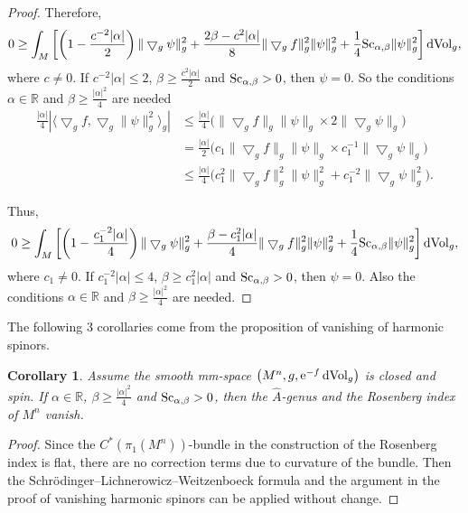 \documentclass[pdftex]{sigma}
\newtheorem{Corollary}[Theorem]{Corollary}
\begin{document}
\begin{proof}
Therefore,
\begin{equation*}
0 \geq \int_M \left[\left(1- \frac{c^{-2} |\alpha|}{2}\right)\|\bigtriangledown_g\psi\|^2_g + \frac{2\beta - c^{2} |\alpha|}{8} \|\bigtriangledown_gf\|^2_g\|\psi\|^2_g + \frac{1}{4} {\rm Sc}_{\alpha, \beta} \|\psi\|^2_g \right]  {\rm dVol}_g ,
\end{equation*}
where $c\neq 0$.
If $c^{-2} |\alpha| \leq 2$, $\beta \geq \frac{c^{2} |\alpha|}{2}$ and ${\rm Sc}_{\alpha, \beta} > 0$, then $\psi = 0$. So the conditions $\alpha \in \mathbb{R}$ and $\beta \geq \frac{|\alpha|^2}{4}$ are needed
\begin{align*}
\frac{|\alpha|}{4}|\big\langle\bigtriangledown_gf, \bigtriangledown_g \|\psi\|^2_g \big\rangle_g| &\leq \frac{|\alpha|}{4}\big(\|\bigtriangledown_gf\|_g \|\psi\|_g \times 2 \|\bigtriangledown_g \psi\|_g\big)\\
& = \frac{|\alpha|}{2}\big( c_1 \|\bigtriangledown_gf\|_g\|\psi\|_g \times c_1^{-1} \|\bigtriangledown_g\psi\|_g\big) \\
& \leq \frac{|\alpha|}{4} \big(c_1^2 \|\bigtriangledown_gf\|^2_g \|\psi\|^2_g + c_1^{-2} \|\bigtriangledown_g\psi\|^2_g\big).
 \end{align*}

Thus,
\begin{equation*}
0 \geq \int_M \left[\left(1- \frac{c_1^{-2} |\alpha|}{4}\right)\|\bigtriangledown_g\psi\|^2_g + \frac{\beta - c_1^{2} |\alpha|}{4} \|\bigtriangledown_gf\|^2_g\|\psi\|^2_g + \frac{1}{4} {\rm Sc}_{\alpha, \beta} \|\psi\|^2_g\right]  {\rm dVol}_g ,
\end{equation*}
where $c_1 \neq 0$. If $c_1^{-2} |\alpha| \leq 4$, $\beta \geq c_1^{2} |\alpha|$ and ${\rm Sc}_{\alpha, \beta} > 0$, then $\psi = 0$. Also the conditions $\alpha \in \mathbb{R}$ and $\beta \geq \frac{|\alpha|^2}{4}$ are needed.
\end{proof}

The following 3 corollaries come from the proposition of vanishing of harmonic spinors.

\begin{Corollary}\label{Genus}
Assume the smooth mm-space $\big(M^n, g, {\rm e}^{-f}\,{\rm dVol}_g\big)$ is closed and spin. If $\alpha \in \mathbb{R}$, $\beta \geq \frac{|\alpha|^2}{4}$ and ${\rm Sc}_{\alpha, \beta}>0$, then the $\widehat{A}$-genus and the Rosenberg index of $M^n$ vanish.
\end{Corollary}

\begin{proof}Since the $C^*(\pi_1(M^n))$-bundle in the construction of the Rosenberg index \cite{MR720934} is flat, there are no correction terms due to curvature of the bundle. Then the Schr\"odinger--Lichne\-ro\-wicz--Weitzenboeck formula and the argument in the proof of vanishing harmonic spinors can be applied without change.
\end{proof}
\end{document}
